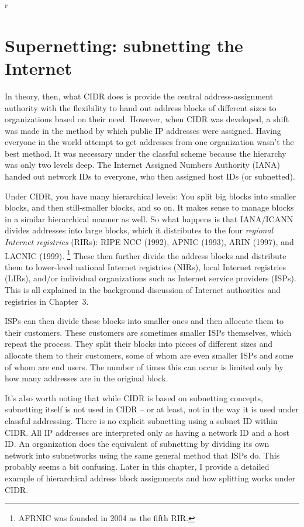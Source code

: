 r

\section{Supernetting: subnetting the Internet}

In theory, then, what CIDR does is provide the central
address-assignment authority with the flexibility to hand out address
blocks of different sizes to organizations based on their need. However,
when CIDR was developed, a shift was made in the method by which public
IP addresses were assigned. Having everyone in the world attempt to get
addresses from one organization wasn't the best method. It was necessary
under the classful scheme because the hierarchy was only two levels
deep. The Internet Assigned Numbers Authority (IANA) handed out network
IDs to everyone, who then assigned host IDs (or subnetted).

Under CIDR, you have many hierarchical levels: You split big blocks into
smaller blocks, and then still-smaller blocks, and so on. It makes sense
to manage blocks in a similar hierarchical manner as well.
So what happens is that IANA/ICANN divides addresses into large blocks, which it distributes to the four \emph{regional Internet registries} (RIRs):
RIPE NCC (1992), APNIC (1993), ARIN (1997), and LACNIC (1999).%
   \footnote{AFRNIC was founded in 2004 as the fifth RIR.}
These then further divide the address blocks and distribute them to lower-level national Internet registries (NIRs),
local Internet registries (LIRs), and/or individual organizations such as Internet
service providers (ISPs).
This is all explained in the background discussion of Internet authorities and registries in {Chapter~3}.

ISPs can then divide these blocks into smaller ones and then allocate
them to their customers. These customers are sometimes smaller ISPs
themselves, which repeat the process. They split their blocks into
pieces of different sizes and allocate them to their customers, some of
whom are even smaller ISPs and some of whom are end users. The number of
times this can occur is limited only by how many addresses are in the
original block.

It's also worth noting that while CIDR is based on subnetting concepts,
subnetting itself is not used in CIDR -- or at least, not in the way it
is used under classful addressing. There is no explicit subnetting using
a subnet ID within CIDR. All IP addresses are interpreted only as having
a network ID and a host ID. An organization does the equivalent of
subnetting by dividing its own network into subnetworks using the same
general method that ISPs do. This probably seems a bit confusing. Later
in this chapter, I provide a detailed example of hierarchical address
block assignments and how splitting works under CIDR.



